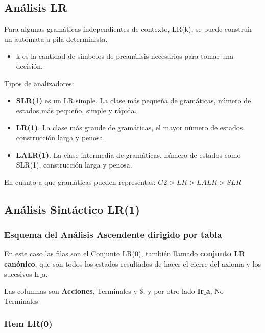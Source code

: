 \documentclass[12pt, twoside, openright]{report} %
\begin{document}
\subsection{Análisis LR}
Para algunas gramáticas independientes de contexto, LR(k), se puede construir un autómata a pila determinista.

\begin{itemize}
	\item k es la cantidad de símbolos de preanálisis necesarios para tomar una decisión.
\end{itemize}

Tipos de analizadores:
\begin{itemize}
	\item \textbf{SLR(1)} es un LR simple. La clase más pequeña de gramáticas, número de estados más pequeño, simple y rápida.
	\item \textbf{LR(1)}. La clase más grande de gramáticas, el mayor número de estados, construcción larga y penosa.
	\item \textbf{LALR(1)}. La clase intermedia de gramáticas, número de estados como SLR(1), construcción larga y penosa.
\end{itemize}
En cuanto a que gramáticas pueden representas: $G2>LR>LALR>SLR$

\begin{figure}[H]
	{\def\svgwidth{.9\textwidth}
		}
\end{figure}

\subsection{Análisis Sintáctico LR(1)}

\subsubsection{Esquema del Análisis Ascendente dirigido por tabla}
En este caso las filas son el Conjunto LR(0), también llamado \textbf{conjunto LR canónico}, que son todos los estados resultados de hacer el cierre del axioma y los sucesivos Ir$\_$a.

Las columnas son \textbf{Acciones}, Terminales y \$, y por otro lado \textbf{Ir$\_$a}, No Terminales.

\subsubsection{Item LR(0)}
\end{document}

